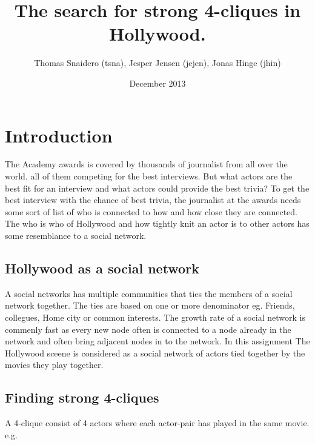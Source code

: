 \documentclass{article}
\title{The search for strong 4-cliques in Hollywood.}
\author{Thomas Snaidero (tsna), Jesper Jensen (jejen), Jonas Hinge (jhin)}
\date{December 2013}
\begin{document}
\maketitle

\section{Introduction}
The Academy awards is covered by thousands of journalist from all over the world, all of them competing for the best interviews. But what actors are the best fit for an interview and what actors could provide the best trivia?
To get the best interview with the chance of best trivia, the journalist at the awards needs some sort of list of who is connected to how and how close they are connected. The who is who of Hollywood and how tightly knit an actor is to other actors has some resemblance to a social network.

\subsection{Hollywood as a social network}
A social networks has multiple communities that ties the members of a social network together. The ties are based on one or more denominator eg. Friends, collegues, Home city or common interests.
The growth rate of a social network is commenly fast as every new node often is connected to a node already in the network and often bring adjacent nodes in to the network. In this assignment The Hollywood sceene is considered as a social network of actors tied together by the movies they play together.

\subsection{Finding strong 4-cliques}
A 4-clique consist of 4 actors where each actor-pair has played in the same movie. e.g. 
\end{document}
